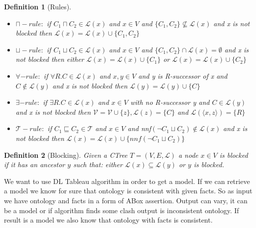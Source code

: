 \documentclass[12pt,a4paper]{article}
\newtheorem{definition}{Definition}[subsection]
\begin{document}
\begin{definition}[Rules]
~\begin{itemize}
	\item $\sqcap-rule:$ if $C_{1} \sqcap C_{2} \in \mathcal{L}(x)$ and $x \in V$ and $\{ C_{1}, C_{2} \} \not \subseteq \mathcal{L}(x)$ and x is not blocked then $\mathcal{L}(x) = \mathcal{L}(x) \cup \{ C_{1}, C_{2} \}$
	
	\item $\sqcup-rule:$ if $C_{1} \sqcup C_{2} \in \mathcal{L}(x)$ and $x \in V$ and $ \{ C_{1}, C_{2} \} \cap \mathcal{L}(x) = \emptyset$ and x is not blocked then either $\mathcal{L}(x) = \mathcal{L}(x) \cup \{ C_{1} \}$ or $\mathcal{L}(x) = \mathcal{L}(x) \cup \{ C_{2} \}$
	
	\item $\forall-rule:$ if $\forall R.C \in \mathcal{L}(x)$ and $x,y \in V$ and y is R-successor of x and $C \not \in \mathcal{L}(y)$ and x is not blocked then $\mathcal{L}(y) = \mathcal{L}(y) \cup \{ C \}$
	
	\item $\exists-rule:$ if $\exists R.C \in \mathcal{L}(x)$ and $x \in V$ with no R-successor y and $C \in \mathcal{L}(y)$ and x is not blocked then $\mathcal{V} = \mathcal{V} \cup \{ z \}, \mathcal{L}(z) = \{ C\}$ and $\mathcal{L}( \langle x, z \rangle ) = \{ R \}$
	
	\item $\mathcal{T}-rule:$ if $C_{1} \sqsubseteq C_{2} \in \mathcal{T}$ and $x \in V$ and nnf$(\neg C_{1} \sqcup C_{2}) \not \in \mathcal{L}(x)$ and x is not blocked then $\mathcal{L}(x) = \mathcal{L}(x) \cup \{ nnf(\neg C_{1} \sqcup C_{2}) \}$
\end{itemize}
\end{definition}

\begin{definition}[Blocking]
Given a CTree $T = (V, E, \mathcal{L})$ a node $x \in V$ is blocked if it has an ancestor $y$ such that: either $\mathcal{L}(x) \subseteq \mathcal{L}(y)$ or $y$ is blocked.

\end{definition}

We want to use DL Tableau algorithm in order to get a model. If we can retrieve a model we know for sure that ontology is consistent with given facts. So as input we have ontology and facts in a form of ABox assertion. Output can vary, it can be a model or if algorithm finds some clash output is inconsistent ontology. If result is a model we also know that ontology with facts is consistent. 
\end{document}
